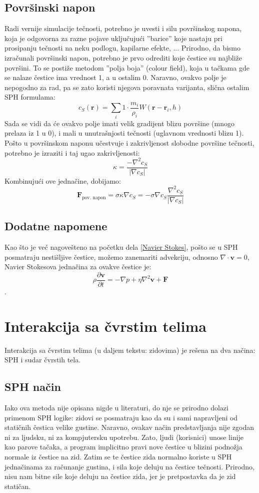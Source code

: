 \documentclass[12pt]{article}
\renewcommand{\vec}[1]{\mathbf{#1}}
\begin{document}
    \subsection{Povr\v sinski napon}
        Radi vernije simulacije te\v cnosti, potrebno je uvesti i silu povr\v sinskog napona, koja je odgovorna za razne pojave uklju\v cuju\'ci ''barice'' koje nastaju pri prosipanju te\v cnosti na neku podlogu, kapilarne efekte, ... Prirodno, da bismo izra\v cunali povr\v sinski napon, potrebno je prvo odrediti koje \v cestice su najbli\v ze povr\v sini. To se posti\v ze metodom ''polja boja'' (colour field), koja u ta\v ckama gde se nalaze \v cestice ima vrednost 1, a u ostalim 0. Naravno, ovakvo polje je nepogodno za rad, pa se zato koristi njegova poravnata varijanta, sli\v cna ostalim SPH formulama:
        $$c_S(\vec{r}) = \sum_i 1\cdot\frac{m_i}{\rho_i}W(\vec{r}-\vec{r}_i, h)$$
        Sada se vidi da \'ce ovakvo polje imati velik gradijent blizu povr\v sine (mnogo prelaza iz 1 u 0), i mali u unutra\v snjosti te\v cnosti (uglavnom vrednosti blizu 1). Po\v sto u povr\v sinskom naponu u\v cestvuje i zakrivljenost slobodne povr\v sine te\v cnosti, potrebno je izraziti i taj ugao zakrivljenosti:
        $$\kappa = \frac{-\nabla^2c_S}{|\nabla c_S|}$$
        Kombinuju\'ci ove jedna\v cine, dobijamo:
        $$\vec{F}_{\text{pov. napon}} = \sigma\kappa\nabla c_S = -\sigma \nabla c_S \frac{\nabla^2 c_S}{|\nabla c_S|}$$
    \subsection{Dodatne napomene}
        Kao \v sto je ve\'c nagove\v steno na po\v cetku dela \ref{Navier Stokes}, po\v sto se u SPH posmatraju nesti\v sljive \v cestice, mo\v zemo zanemariti advekciju, odnosno $\nabla \cdot \vec{v}=0$, Navier Stokesova jedna\v cina za ovakve \v cestice je:
        $$\rho \frac{\partial \vec{v}}{\partial t} = -\nabla p +\eta \nabla^2\vec{v}+\vec{F}$$.
\section{Interakcija sa \v cvrstim telima}
    Interakcija sa \v cvrstim telima (u daljem tekstu: zidovima) je re\v sena na dva na\v cina: SPH i sudar \v cvrstih tela.
    \subsection{SPH na\v cin}
        Iako ova metoda nije opisana nigde u literaturi, do nje se prirodno dolazi primenom SPH logike: zidovi se posmatraju kao da su i sami napravljeni od stati\v cnih \v cestica velike gustine. Naravno, ovakav na\v cin predstavljanja nije zgodan ni za ljudsku, ni za kompjutersku upotrebu. Zato, ljudi (korisnici) unose linije kao parove ta\v caka, a program implicitno pravi nove \v cestice u blizini podno\v zja normale iz \v cestice na zid. Zatim se te \v cestice zida normalno koriste u SPH jedna\v cinama za ra\v cunanje gustina, i sila koje deluju na \v cestice te\v cnosti. Prirodno, nisu nam bitne sile koje deluju na \v cestice zida, jer je pretpostavka da je zid stati\v can.
\end{document}
